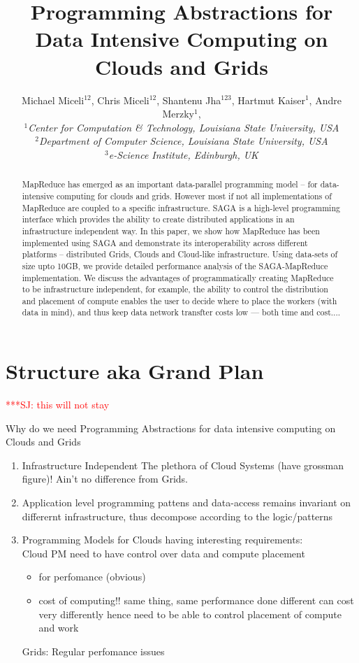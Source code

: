 \documentclass[conference,final]{IEEEtran}
\title{Programming Abstractions for Data Intensive Computing on Clouds and Grids}
\author{Michael Miceli$^{12}$, Chris Miceli$^{12}$, Shantenu
  Jha$^{123}$, Hartmut Kaiser$^{1}$, Andre Merzky$^{1}$, \\
  \small{\emph{$^{1}$Center for Computation \& Technology, Louisiana
      State University, USA}}\\
  \small{\emph{$^{2}$Department of Computer Science, Louisiana State
      University, USA}}\\
  \small{\emph{$^{3}$e-Science Institute, Edinburgh, UK}}\\
}
\newcommand{\jhanote}[1]{ {\textcolor{red} { ***SJ: #1 }}}
\newcommand{\jhanote}[1]{}
\begin{document}
\maketitle

\begin{abstract}
  MapReduce has emerged as an important data-parallel programming
  model -- for data-intensive computing for clouds and grids. However
  most if not all implementations of MapReduce are coupled to a
  specific infrastructure.  SAGA is a high-level programming interface
  which provides the ability to create distributed applications in an
  infrastructure independent way. In this paper, we show how MapReduce
  has been implemented using SAGA and demonstrate its interoperability
  across different platforms -- distributed Grids, Clouds and
  Cloud-like infrastructure. Using data-sets of size upto 10GB, we
  provide detailed performance analysis of the SAGA-MapReduce
  implementation.  We discuss the advantages of programmatically
  creating MapReduce to be infrastructure independent, for example,
  the ability to control the distribution and placement of compute
  enables the user to decide where to place the workers (with data in
  mind), and thus keep data network transfter costs low --- both time
  and cost....
\end{abstract}


\section*{Structure aka Grand Plan}\jhanote{this will not stay}

Why do we need Programming Abstractions for data intensive computing
on Clouds and Grids

\begin{enumerate}
\item  Infrastructure Independent
   The plethora of Cloud Systems (have grossman figure)!
   Ain't no difference from Grids.

\item Application level programming pattens and data-access remains
invariant on differernt infrastructure, thus decompose
according to the logic/patterns

\item  Programming Models for Clouds having interesting
requirements:\\
Cloud PM  need to have control over data and compute placement

\begin{itemize}
 \item for perfomance (obvious)
 \item cost of computing!!
       same thing, same performance done different can cost very differently
       hence need to be able to control placement of compute and work
\end{itemize}

Grids: Regular perfomance issues
\end{enumerate}
\end{document}
